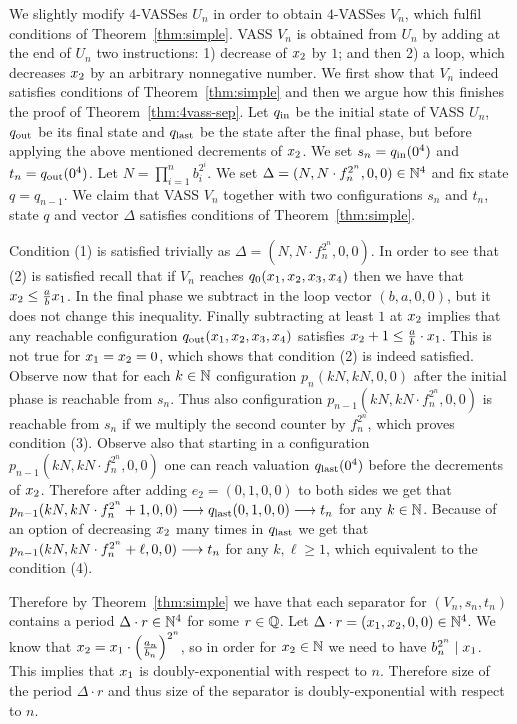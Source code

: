 We slightly modify $4$-VASSes $U_n$ in order to obtain $4$-VASSes $V_n$, which fulfil conditions of Theorem~\ref{thm:simple}.
VASS $V_n$ is obtained from $U_n$ by adding at the end of $U_n$ two instructions:
1) decrease of $x_2$ by $1$; and then 2) a loop, which decreases $x_2$ by an arbitrary nonnegative number.
We first show that $V_n$ indeed satisfies conditions of Theorem~\ref{thm:simple} and then we argue how this finishes
the proof of Theorem~\ref{thm:4vass-sep}.
Let $q_{\textup{in}}$ be the initial state of VASS $U_n$, $q_{\textup{out}}$ be its final state and $q_{\textup{last}}$ be the state after the final phase,
but before applying the above mentioned decrements of $x_2$.
We set $s_n = q_{\textup{in}}(0^4)$ and $t_n = q_{\textup{out}}(0^4)$. Let $N = \prod_{i=1}^n b_i^{2^i}$.
We set $\Delta = (N, N \cdot f_n^{2^n}, 0, 0) \in \mathbb{N}^4$ and fix state $q = q_{n-1}$.
We claim that VASS $V_n$ together with two configurations $s_n$ and $t_n$,
state $q$ and vector $\Delta$ satisfies conditions of Theorem~\ref{thm:simple}.

Condition (1) is satisfied trivially as $\Delta = (N, N \cdot f_n^{2^n}, 0, 0)$.
In order to see that (2) is satisfied recall that if $V_n$ reaches $q_0(x_1, x_2, x_3, x_4)$ then
we have that $x_2 \leq \frac{a}{b} x_1$. In the final phase we subtract in the loop vector $(b, a, 0, 0)$,
but it does not change this inequality. Finally subtracting at least $1$ at $x_2$ implies that any
reachable configuration $q_{\textup{out}}(x_1, x_2, x_3, x_4)$ satisfies $x_2 + 1 \leq \frac{a}{b} \cdot x_1$.
This is not true for $x_1 = x_2 = 0$, which shows that condition (2) is indeed satisfied.
Observe now that for each $k \in \mathbb{N}$ configuration $p_n(kN, kN, 0, 0)$ after the initial phase is reachable from $s_n$.
Thus also configuration $p_{n-1}(kN, kN\cdot f_n^{2^n}, 0, 0)$ is reachable from $s_n$ if we multiply the second counter by $f_n^{2^n}$,
which proves condition (3).
Observe also that starting in a configuration $p_{n-1}(kN, kN\cdot f_n^{2^n}, 0, 0)$ one can reach valuation $q_{\textup{last}}(0^4)$ before
the decrements of $x_2$. Therefore after adding $e_2 = (0, 1, 0, 0)$ to both sides
we get that $p_{n-1}(kN, kN\cdot f_n^{2^n}+1, 0, 0) \longrightarrow q_{\textup{last}}(0,1,0,0) \longrightarrow t_n$ for any $k \in \mathbb{N}$.
Because of an option of decreasing $x_2$ many times in $q_{\textup{last}}$ we get that 
$p_{n-1}(kN, kN\cdot f_n^{2^n} + \ell, 0, 0) \longrightarrow t_n$ for any $k, \ell \geq 1$, which equivalent to the condition (4).

Therefore by Theorem~\ref{thm:simple} we have that each separator for $(V_n, s_n, t_n)$
contains a period $\Delta \cdot r \in \mathbb{N}^4$ for some $r \in \mathbb{Q}$. Let $\Delta \cdot r = (x_1, x_2, 0, 0) \in \mathbb{N}^4$.
We know that $x_2 = x_1 \cdot \Big(\frac{a_n}{b_n}\Big)^{2^n}$, so in order for $x_2 \in \mathbb{N}$
we need to have $b_n^{2^n} \mid x_1$. This implies that $x_1$ is doubly-exponential with respect to $n$.
Therefore size of the period $\Delta \cdot r$ and thus size of the separator is doubly-exponential with respect to $n$.

